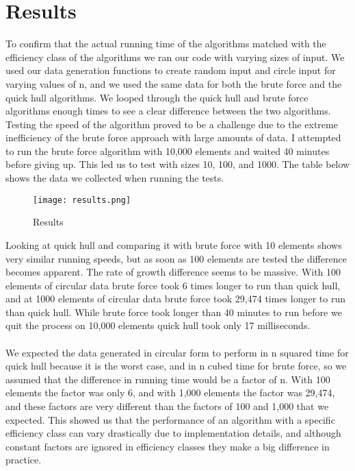 \documentclass[a4paper, 12pt]{article}
\begin{document}
{  \section{Results}
To confirm that the actual running time of the algorithms matched with the efficiency class of the algorithms we ran our code with varying sizes of input. We used our data generation functions to create random input and circle input for varying values of n, and we used the same data for both the brute force and the quick hull algorithms. We looped through the quick hull and brute force algorithms enough times to see a clear difference between the two algorithms. \\

Testing the speed of the algorithm proved to be a challenge due to the extreme inefficiency of the brute force approach with large amounts of data. I attempted to run the brute force algorithm with 10,000 elements and waited 40 minutes before giving up. This led us to test with sizes 10, 100, and 1000. The table below shows the data we collected when running the tests.

  \begin{figure}[H]
    \begin{center}
    \texttt{[image: results.png]}
  \end{center}
    \caption{Results}
    \label{fig:results}
  \end{figure} 
Looking at quick hull and comparing it with brute force with 10 elements shows very similar running
speeds, but as soon as 100 elements are tested the difference becomes apparent. The rate of growth
difference seems to be massive. With 100 elements of circular data brute force took 6 times longer to
run than quick hull, and at 1000 elements of circular data brute force took 29,474 times longer to run
than quick hull. While brute force took longer than 40 minutes to run before we quit the process on
10,000 elements quick hull took only 17 milliseconds.
\\\\
We expected the data generated in circular form to perform in n squared time for quick hull because it is
the worst case, and in n cubed time for brute force, so we assumed that the difference in running time
would be a factor of n. With 100 elements the factor was only 6, and with 1,000 elements the factor was
29,474, and these factors are very different than the factors of 100 and 1,000 that we expected. This
showed us that the performance of an algorithm with a specific efficiency class can vary drastically due
to implementation details, and although constant factors are ignored in efficiency classes they make a
big difference in practice.
}
\end{document}
